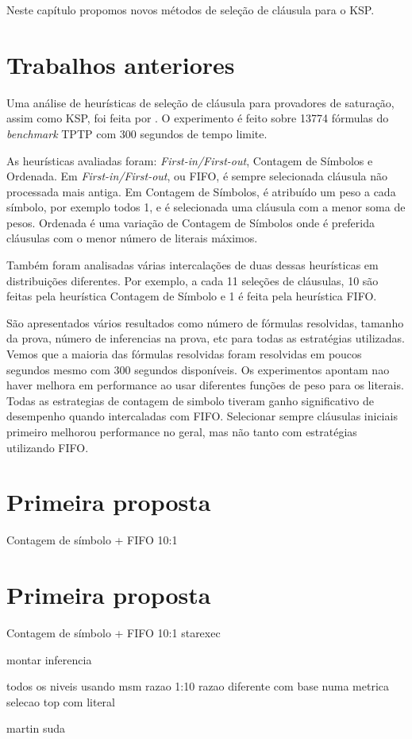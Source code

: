 Neste capítulo propomos novos métodos de seleção de cláusula para o KSP.

\section{Trabalhos anteriores}
Uma análise de heurísticas de seleção de cláusula para provadores de saturação, assim como KSP, foi feita por \cite{stephan}. O experimento é feito sobre 13774 fórmulas do \textit{benchmark} TPTP \cite{TPTP} com 300 segundos de tempo limite.

As heurísticas avaliadas foram: \textit{First-in/First-out}, Contagem de Símbolos e Ordenada. Em \textit{First-in/First-out}, ou FIFO, é sempre selecionada cláusula não processada mais antiga. Em Contagem de Símbolos, é atribuído um peso a cada símbolo, por exemplo todos 1, e é selecionada uma cláusula com a menor soma de pesos. Ordenada é uma variação de Contagem de Símbolos onde é preferida cláusulas com o menor número de literais máximos.

Também foram analisadas várias intercalações de duas dessas heurísticas em distribuições diferentes. Por exemplo, a cada 11 seleções de cláusulas, 10 são feitas pela heurística Contagem de Símbolo e 1 é feita pela heurística FIFO.

São apresentados vários resultados como número de fórmulas resolvidas, tamanho da prova, número de inferencias na prova, etc para todas as estratégias utilizadas. Vemos que a maioria das fórmulas resolvidas foram resolvidas em poucos segundos mesmo com 300 segundos disponíveis. Os experimentos apontam nao haver melhora em performance ao usar diferentes funções de peso para os literais. Todas as estrategias de contagem de simbolo tiveram ganho significativo de desempenho quando intercaladas com FIFO. Selecionar sempre cláusulas iniciais primeiro melhorou performance no geral, mas não tanto com estratégias utilizando FIFO.

\section{Primeira proposta}
Contagem de símbolo + FIFO 10:1



\section{Primeira proposta}
Contagem de símbolo + FIFO 10:1
starexec

montar inferencia


todos os niveis usando msm razao 1:10
razao diferente com base numa metrica
selecao top com literal

martin suda
